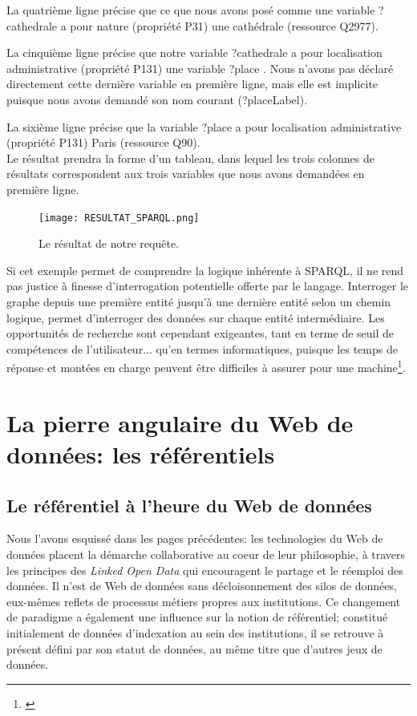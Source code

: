 \documentclass[a4paper,12pt,twoside]{book}
\begin{document}
La quatrième ligne précise que ce que nous avons posé comme une variable \og ?cathedrale\fg{} a pour nature (propriété P31) une cathédrale (ressource Q2977). 

La cinquième ligne précise que notre variable \og ?cathedrale \fg{} a pour localisation administrative (propriété P131) une variable \og ?place \fg. Nous n'avons pas déclaré directement cette dernière variable en première ligne, mais elle est implicite puisque nous avons demandé son nom courant (\og ?placeLabel\fg). 

La sixième ligne précise que la variable \og ?place \fg{} a pour localisation administrative (propriété P131) Paris (ressource Q90).\\

Le résultat prendra la forme d'un tableau, dans lequel les trois colonnes de résultats correspondent aux trois variables que nous avons demandées en première ligne.
\begin{figure}[h]
    \centering
    \texttt{[image: RESULTAT\_SPARQL.png]}
    \caption{Le résultat de notre requête.}
    \label{fig:enter-label}
\end{figure}

Si cet exemple permet de comprendre la logique inhérente à SPARQL, il ne rend pas justice à finesse d'interrogation potentielle offerte par le langage. Interroger le graphe depuis une première entité jusqu'à une dernière entité selon un chemin logique, permet d'interroger des données sur chaque entité intermédiaire. Les opportunités de recherche sont cependant exigeantes, tant en terme de seuil de compétences de l'utilisateur... qu'en termes informatiques, puisque les temps de réponse et montées en charge peuvent être difficiles à assurer pour une machine\footnote{\cite{poupeauAudelaLimitesQue2018}}. 



 
 \part{La pierre angulaire du Web de données: les référentiels}
 

 \chapter{Le référentiel à l'heure du Web de données}\label{referentiel-Wdd}
Nous l'avons esquissé dans les pages précédentes: les technologies du Web de données placent la démarche collaborative au coeur de leur philosophie, à travers les principes des \textit{Linked Open Data} qui encouragent le partage et le réemploi des données. Il n'est de Web de données sans décloisonnement des silos de données, eux-mêmes reflets de processus métiers propres aux institutions. Ce changement de paradigme a également une influence sur la notion de référentiel; constitué initialement de données d'indexation au sein des institutions, il se retrouve à présent défini par son statut de données, au même titre que d'autres jeux de données.\\ 
\end{document}
